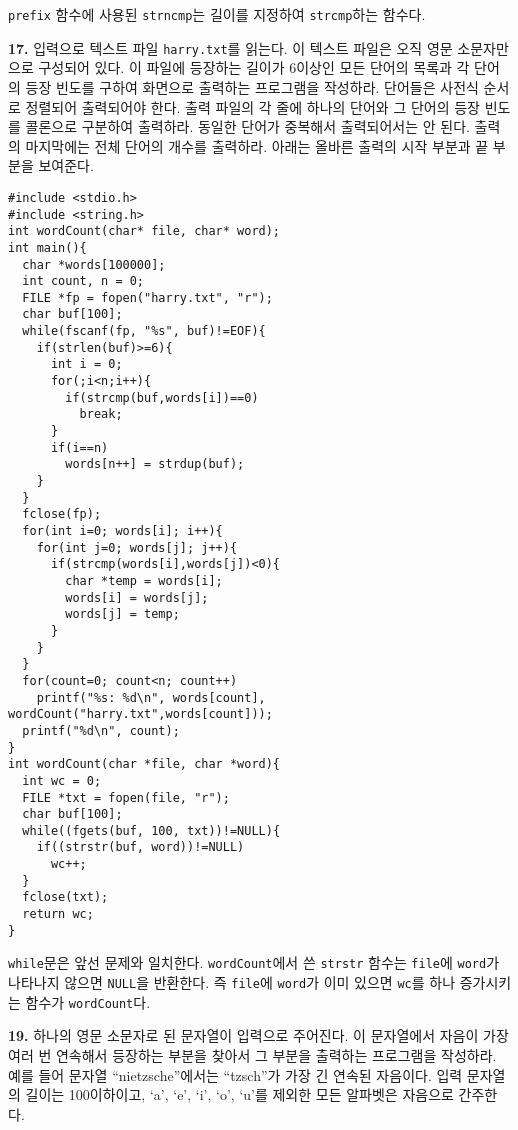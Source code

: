 \documentclass[a4paper,chapter,atbegshi]{oblivoir}
\begin{document}
\texttt{prefix} 함수에 사용된 \texttt{strncmp}는 길이를 지정하여
\texttt{strcmp}하는 함수다.
\hfill\break
\begin{mdframed}\textbf{17. }
  입력으로 텍스트 파일 \texttt{harry.txt}를 읽는다. 이 텍스트 파일은 오직
  영문 소문자만으로 구성되어 있다. 이 파일에 등장하는 길이가 6이상인 모든
  단어의 목록과 각 단어의 등장 빈도를 구하여 화면으로 출력하는 프로그램을
  작성하라. 단어들은 사전식 순서로 정렬되어 출력되어야 한다. 출력 파일의
  각 줄에 하나의 단어와 그 단어의 등장 빈도를 콜론으로 구분하여 출력하라.
  동일한 단어가 중복해서 출력되어서는 안 된다. 출력의 마지막에는 전체 단어의
  개수를 출력하라. 아래는 올바른 출력의 시작 부분과 끝 부분을 보여준다.
\end{mdframed}
\begin{lstlisting}[style=C]
#include <stdio.h>
#include <string.h>
int wordCount(char* file, char* word);
int main(){
  char *words[100000];
  int count, n = 0;
  FILE *fp = fopen("harry.txt", "r");
  char buf[100];
  while(fscanf(fp, "%s", buf)!=EOF){
    if(strlen(buf)>=6){
      int i = 0;
      for(;i<n;i++){
        if(strcmp(buf,words[i])==0)
          break;
      }
      if(i==n)
        words[n++] = strdup(buf);
    }
  }
  fclose(fp);
  for(int i=0; words[i]; i++){
    for(int j=0; words[j]; j++){
      if(strcmp(words[i],words[j])<0){
        char *temp = words[i];
        words[i] = words[j];
        words[j] = temp;
      }
    }
  }
  for(count=0; count<n; count++)
    printf("%s: %d\n", words[count], wordCount("harry.txt",words[count]));
  printf("%d\n", count);
}
int wordCount(char *file, char *word){
  int wc = 0;
  FILE *txt = fopen(file, "r");
  char buf[100];
  while((fgets(buf, 100, txt))!=NULL){
    if((strstr(buf, word))!=NULL)
      wc++;
  }
  fclose(txt);
  return wc;
}
\end{lstlisting}
\texttt{while}문은 앞선 문제와 일치한다. \texttt{wordCount}에서 쓴
\texttt{strstr} 함수는 \texttt{file}에 \texttt{word}가 나타나지 않으면 
\texttt{NULL}을 반환한다. 즉 \texttt{file}에 \texttt{word}가 이미 있으면
\texttt{wc}를 하나 증가시키는 함수가 \texttt{wordCount}다.
\hfill\break
\begin{mdframed}\textbf{19. }
  하나의 영문 소문자로 된 문자열이 입력으로 주어진다. 이 문자열에서 자음이
  가장 여러 번 연속해서 등장하는 부분을 찾아서 그 부분을 출력하는 프로그램을
  작성하라. 예를 들어 문자열 ``nietzsche''에서는 ``tzsch''가 가장 긴 연속된
  자음이다. 입력 문자열의 길이는 100이하이고, `a', `e', `i', `o', `u'를 제외한
  모든 알파벳은 자음으로 간주한다. 
\end{mdframed}
\end{document}
